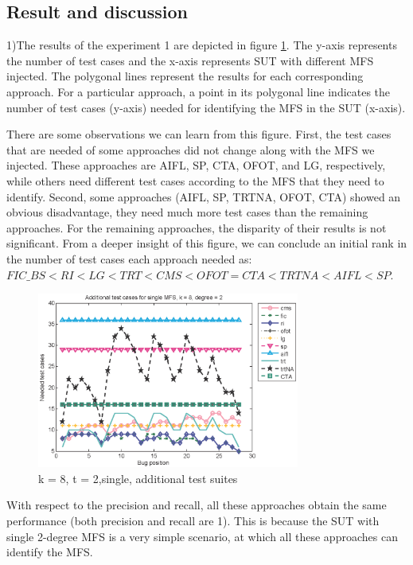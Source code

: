 \documentclass{sig-alternate-05-2015}
\begin{document}
{{\subsection{Result and discussion}

1)The results of the experiment 1 are depicted in figure \ref{fig_single}. The y-axis represents the number of test cases and the x-axis represents SUT with different MFS injected. The polygonal lines represent the results for each corresponding approach.
For a particular approach, a point in its polygonal line indicates the number of test cases (y-axis) needed for identifying the MFS in the SUT (x-axis).

There are some observations we can learn from this figure. First, the test cases that are needed of some approaches did not change along with the MFS we injected. These approaches are AIFL, SP, CTA, OFOT, and LG, respectively, while others need different test cases according to the MFS that they need to identify. Second, some approaches (AIFL, SP, TRTNA, OFOT, CTA) showed an obvious disadvantage, they need much more test cases than the remaining approaches. For the remaining approaches, the disparity of their results is not significant. From a deeper insight of this figure, we can conclude an initial rank in the number of test cases each approach needed as:  $FIC\_BS < RI < LG < TRT < CMS < OFOT = CTA < TRTNA < AIFL < SP$.

\begin{figure}
 \centering
 \includegraphics[width=3.4in]{single.eps}
 \caption{k = 8, t = 2,single, additional test suites}
 \label{fig_single}
\end{figure}

With respect to the precision and recall, all these approaches obtain the same performance (both precision and recall are 1). This is because the SUT with single 2-degree MFS is a very simple scenario, at which all these approaches can identify the MFS.

}}
\end{document}
